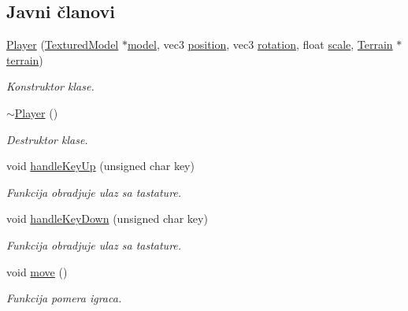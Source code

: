 \subsection*{Javni članovi}
\begin{DoxyCompactItemize}
\item 
\hyperlink{classentity_1_1Player_a0edc8eeed60bf40c1ec63bb4f56a89ff}{Player} (\hyperlink{classmodel_1_1TexturedModel}{Textured\+Model} $\ast$\hyperlink{classentity_1_1Entity_ac7848c5d47d4b2bf12c84ddbbc32052a}{model}, vec3 \hyperlink{classentity_1_1Entity_ad409c7f2085024479b276c2b6948bddb}{position}, vec3 \hyperlink{classentity_1_1Entity_aedb4c5dc1cfbc8cb3f6deb565ea920cb}{rotation}, float \hyperlink{classentity_1_1Entity_a59e5d5e3575df70cd5c74b5d739d84ca}{scale}, \hyperlink{classterrain_1_1Terrain}{Terrain} $\ast$\hyperlink{classentity_1_1Player_adc298ca7a3d8ab3528440489ed4ea60e}{terrain})
\begin{DoxyCompactList}\small\item\em Konstruktor klase. \end{DoxyCompactList}\item 
\hyperlink{classentity_1_1Player_aba0d4255d0d8624d01067418279bc9a1}{$\sim$\+Player} ()
\begin{DoxyCompactList}\small\item\em Destruktor klase. \end{DoxyCompactList}\item 
void \hyperlink{classentity_1_1Player_a27a2007873610439598c0ac07a91f3ac}{handle\+Key\+Up} (unsigned char key)
\begin{DoxyCompactList}\small\item\em Funkcija obradjuje ulaz sa tastature. \end{DoxyCompactList}\item 
void \hyperlink{classentity_1_1Player_af3d0b548d6daeb37d03f9fa57fb28f8a}{handle\+Key\+Down} (unsigned char key)
\begin{DoxyCompactList}\small\item\em Funkcija obradjuje ulaz sa tastature. \end{DoxyCompactList}\item 
void \hyperlink{classentity_1_1Player_a9b0a7ab96a4ba7c24c7ddac8f07c4d5e}{move} ()
\begin{DoxyCompactList}\small\item\em Funkcija pomera igraca. \end{DoxyCompactList}\end{DoxyCompactItemize}
